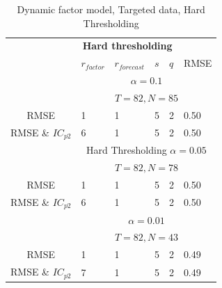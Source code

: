 \documentclass[12pt]{article}
\begin{document}
\begin{table}[ht]
	\centering
	\begin{tabular}{c|lllll}
		   & \multicolumn{4}{c}{\textbf{Hard thresholding}} \\
		   & $r_{factor}$ & $r_{forecast}$ & $s$ & $q$ & RMSE\\
		 \hline
		 \hline
		  & \multicolumn{5}{c}{$\alpha=0.1$} \\ 
		  & \multicolumn{5}{c}{$T=82, N=85$} \\
		  \hline
		   	RMSE & 1 & 1 & 5 & 2 & 0.50 \\
		   	RMSE \& $IC_{p2}$ & 6 & 1 & 5 & 2 & 0.50 \\
		 \hline
 		 \hline
		  & \multicolumn{5}{c}{Hard Thresholding $\alpha=0.05$} \\ 
 		 & \multicolumn{5}{c}{$T=82, N=78$} \\
		  \hline
		   	RMSE & 1 & 1 & 5 & 2 & 0.50 \\
		   	RMSE \& $IC_{p2}$ & 6 & 1 & 5 & 2 & 0.50 \\
		 \hline
 		 \hline
 		 & \multicolumn{5}{c}{$\alpha=0.01$} \\ 
 		 & \multicolumn{5}{c}{$T=82, N=43$} \\
		  \hline
		   	RMSE & 1 & 1 & 5 & 2 & 0.49 \\
		   	RMSE \& $IC_{p2}$ & 7 & 1 & 5 & 2 & 0.49 \\
		 \hline
 		 \hline
	\end{tabular}
	\caption{Dynamic factor model, Targeted data, Hard Thresholding}
	\label{results dynamic factor model, targeted data sets}
\end{table}
\end{document}
